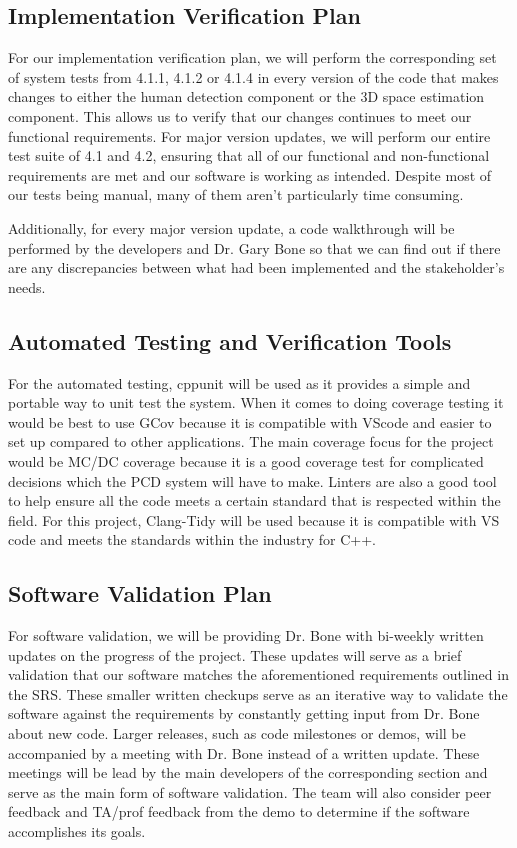 \documentclass[12pt, titlepage]{article}
\begin{document}
\subsection{Implementation Verification Plan}

For our implementation verification plan, we will perform the corresponding set of system tests from 4.1.1, 4.1.2 or 4.1.4 in every version of the code that makes changes to either the human detection component or the 3D space estimation component. This allows us to verify that our changes continues to meet our functional requirements. 
For major version updates, we will perform our entire test suite of 4.1 and 4.2, ensuring that all of our functional and non-functional requirements are met and our software is working as intended. Despite most of our tests being manual, many of them aren't particularly time consuming.

Additionally, for every major version update, a code walkthrough will be performed by the developers and Dr. Gary Bone so that we can find out if there are any discrepancies between what had been implemented and the stakeholder's needs. 

\subsection{Automated Testing and Verification Tools}

For the automated testing, cppunit will be used as it provides a simple and portable way to unit test the system. When it comes to doing coverage testing it would be best to use GCov because it is compatible with VScode and easier to set up compared to other applications. The main coverage focus for the project would be MC/DC coverage because it is a good coverage test for complicated decisions which the PCD system will have to make.
Linters are also a good tool to help ensure all the code meets a certain standard that is respected within the field. For this project, Clang-Tidy will be used because it is compatible with VS code and meets the standards within the industry for C++.


\subsection{Software Validation Plan}

For software validation, we will be providing Dr. Bone with bi-weekly written updates on the progress of the project. These updates
will serve as a brief validation that our software matches the aforementioned requirements outlined in the SRS. These smaller written checkups serve
as an iterative way to validate the software against the requirements by constantly getting input from Dr. Bone about new code.
Larger releases, such as code milestones or demos, will be accompanied by a meeting with Dr. Bone instead of a written update. 
These meetings will be lead by the main developers of the corresponding section and serve as the main form of software validation. 
The team will also consider peer feedback and TA/prof feedback from the demo to determine if the software accomplishes its goals.
\end{document}
